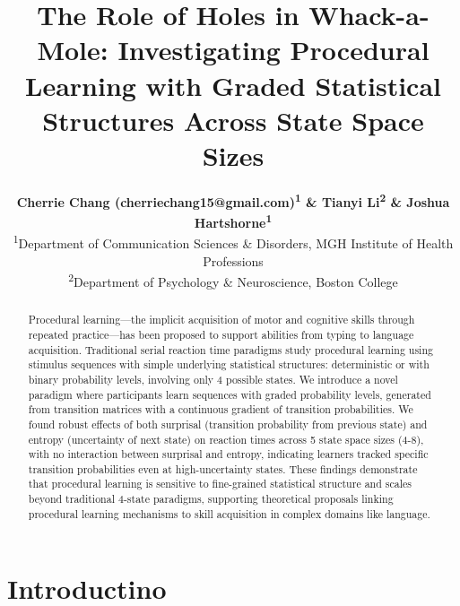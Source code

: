 \documentclass[
  10pt,
  letterpaper]{article}
\title{The Role of Holes in Whack-a-Mole: Investigating Procedural
Learning with Graded Statistical Structures Across State Space Sizes}
\author{}
\date{}
\begin{document}
\author{%
  {\large\bfseries Cherrie Chang (cherriechang15@gmail.com)\textsuperscript{1} \& Tianyi Li\textsuperscript{2} \& Joshua Hartshorne\textsuperscript{1}} \\
  {\normalsize\normalfont
    \textsuperscript{1}Department of Communication Sciences \& Disorders, MGH Institute of Health Professions \\
    \textsuperscript{2}Department of Psychology \& Neuroscience, Boston College
  }%
}
\maketitle
\begin{abstract}
Procedural learning---the implicit acquisition of motor and cognitive
skills through repeated practice---has been proposed to support
abilities from typing to language acquisition. Traditional serial
reaction time paradigms study procedural learning using stimulus
sequences with simple underlying statistical structures: deterministic
or with binary probability levels, involving only 4 possible states. We
introduce a novel paradigm where participants learn sequences with
graded probability levels, generated from transition matrices with a
continuous gradient of transition probabilities. We found robust effects
of both surprisal (transition probability from previous state) and
entropy (uncertainty of next state) on reaction times across 5 state
space sizes (4-8), with no interaction between surprisal and entropy,
indicating learners tracked specific transition probabilities even at
high-uncertainty states. These findings demonstrate that procedural
learning is sensitive to fine-grained statistical structure and scales
beyond traditional 4-state paradigms, supporting theoretical proposals
linking procedural learning mechanisms to skill acquisition in complex
domains like language.

\end{abstract}


\section{Introductino}\label{introductino}
\end{document}
